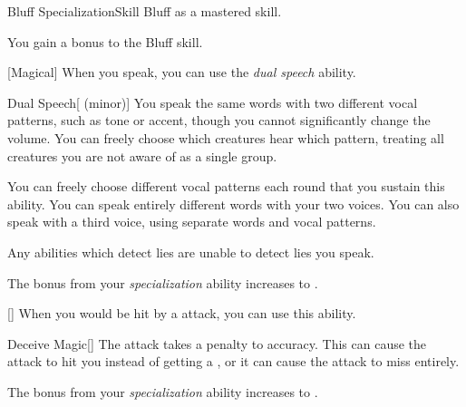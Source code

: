     \begin{feat}{Bluff Specialization}{Skill}
        \featpre Bluff as a mastered skill.

         You gain a  bonus to the Bluff skill.

        [Magical] When you speak, you can use the \textit{dual speech} ability.
        \begin{freeability}{Dual Speech}[ (minor)]
            You speak the same words with two different vocal patterns, such as tone or accent, though you cannot significantly change the volume.
            You can freely choose which creatures hear which pattern, treating all creatures you are not aware of as a single group. 

            You can freely choose different vocal patterns each round that you sustain this ability.
            \rankline
             You can speak entirely different words with your two voices.
             You can also speak with a third voice, using separate words and vocal patterns.
        \end{freeability}

         Any  abilities which detect lies are unable to detect lies you speak.

         The bonus from your \textit{specialization} ability increases to .

        [] When you would be hit by a  attack, you can use this ability.
        \begin{apability}{Deceive Magic}[]
            The attack takes a  penalty to accuracy.
            This can cause the attack to hit you instead of getting a , or it can cause the attack to miss entirely.
        \end{apability}

         The bonus from your \textit{specialization} ability increases to .
    \end{feat}

